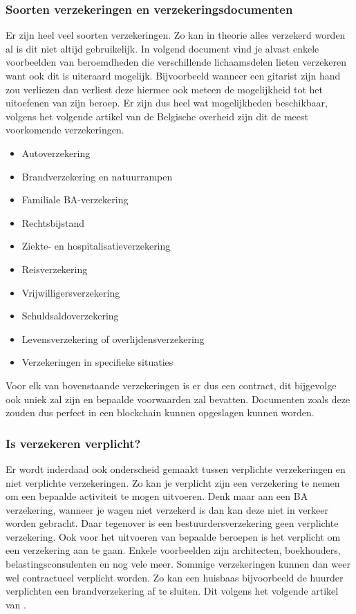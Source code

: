 \subsubsection{Soorten verzekeringen en verzekeringsdocumenten}
Er zijn heel veel soorten verzekeringen. Zo kan in theorie alles verzekerd worden al is dit niet altijd gebruikelijk. In volgend document \textcite{verzekeringen.com2015} vind je alvast enkele voorbeelden van beroemdheden die verschillende lichaamsdelen lieten verzekeren want ook dit is uiteraard mogelijk. Bijvoorbeeld wanneer een gitarist zijn hand zou verliezen dan verliest deze hiermee ook meteen de mogelijkheid tot het uitoefenen van zijn beroep. Er zijn dus heel wat mogelijkheden beschikbaar, volgens het volgende artikel \textcite{BFOverzekeringen} van de Belgische overheid zijn dit de meest voorkomende verzekeringen.

\begin{itemize}
	\item Autoverzekering
	\item Brandverzekering en natuurrampen
	\item Familiale BA-verzekering
	\item Rechtsbijstand
	\item Ziekte- en hospitalisatieverzekering
	\item Reisverzekering
	\item Vrijwilligersverzekering
	\item Schuldsaldoverzekering
	\item Levensverzekering of overlijdensverzekering
	\item Verzekeringen in specifieke situaties
\end{itemize}

Voor elk van bovenstaande verzekeringen is er dus een contract, dit bijgevolge ook uniek zal zijn en bepaalde voorwaarden zal bevatten. Documenten zoals deze zouden dus perfect in een blockchain kunnen opgeslagen kunnen worden. 

\subsubsection{Is verzekeren verplicht?}
Er wordt inderdaad ook onderscheid gemaakt tussen verplichte verzekeringen en niet verplichte verzekeringen. Zo kan je verplicht zijn een verzekering te nemen om een bepaalde activiteit te mogen uitvoeren. Denk maar aan een BA verzekering, wanneer je wagen niet verzekerd is dan kan deze niet in verkeer worden gebracht. Daar tegenover is een bestuurdersverzekering geen verplichte verzekering. Ook voor het uitvoeren van bepaalde beroepen is het verplicht om een verzekering aan te gaan. Enkele voorbeelden zijn architecten, boekhouders, belastingsconsulenten en nog vele meer. Sommige verzekeringen kunnen dan weer wel contractueel verplicht worden. Zo kan een huisbaas bijvoorbeeld de huurder verplichten een brandverzekering af te sluiten. Dit volgens het volgende artikel van \textcite{BFOverplichteVerzekeringen}. 

